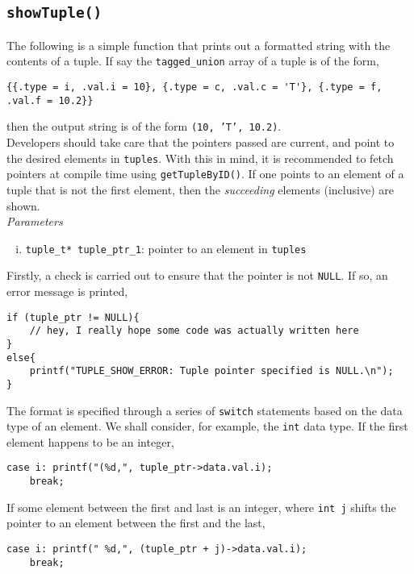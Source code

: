 \documentclass[10pt, a4paper, oneside]{memoir}
\begin{document}
	\subsection{\texttt{showTuple()}}
	
	The following is a simple function that prints out a formatted string with the contents of a tuple. If say the \texttt{tagged_union} array of a tuple is of the form,
\begin{verbatim}
{{.type = i, .val.i = 10}, {.type = c, .val.c = 'T'}, {.type = f, .val.f = 10.2}}
\end{verbatim}
	then the output string is of the form \texttt{(10, 'T', 10.2)}.\\
	
	Developers should take care that the pointers passed are current, and point to the desired elements in \texttt{tuples}. With this in mind, it is recommended to fetch pointers at compile time using \texttt{getTupleByID()}. If one points to an element of a tuple that is not the first element, then the \textit{succeeding} elements (inclusive) are shown.\\
	
	\textit{Parameters}
	\begin{enumerate}[i.]
		\item \texttt{tuple_t* tuple_ptr_1}: pointer to an element in \texttt{tuples}
	\end{enumerate}

	Firstly, a check is carried out to ensure that the pointer is not \texttt{NULL}. If so, an error message is printed,
\begin{verbatim}
if (tuple_ptr != NULL){
	// hey, I really hope some code was actually written here
}
else{
	printf("TUPLE_SHOW_ERROR: Tuple pointer specified is NULL.\n");
}
\end{verbatim}

	The format is specified through a series of \texttt{switch} statements based on the data type of an element. We shall consider, for example, the \texttt{int} data type. If the first element happens to be an integer,
\begin{verbatim}
case i: printf("(%d,", tuple_ptr->data.val.i);
	break;
\end{verbatim}

	If some element between the first and last is an integer, where \texttt{int j} shifts the pointer to an element between the first and the last,
\begin{verbatim}
case i: printf(" %d,", (tuple_ptr + j)->data.val.i);
	break;
\end{verbatim}
\end{document}
